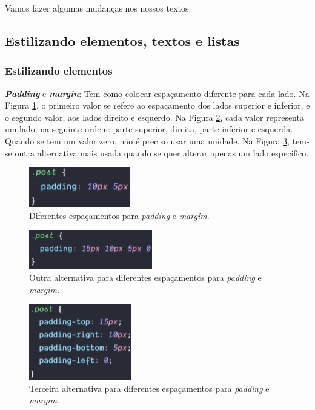 \documentclass[12pt,a4paper]{article}
\begin{document}
	Vamos fazer algumas mudanças nos nossos textos.
	
	\subsection{Estilizando elementos, textos e listas}
	\subsubsection{Estilizando elementos}
	
	\textbf{\textit{Padding}} e \textbf{\textit{margin}}: Tem como colocar espaçamento diferente para cada lado. Na Figura \ref{fig:espacamento01}, o primeiro valor se refere ao espaçamento dos lados superior e inferior, e o segundo valor, aos lados direito e esquerdo. Na Figura \ref{fig:espacamento02}, cada valor representa um lado, na seguinte ordem: parte superior, direita, parte inferior e esquerda. Quando se tem um valor zero, não é preciso usar uma unidade. Na Figura \ref{fig:espacamento03}, tem-se outra alternativa mais usada quando se quer alterar apenas um lado específico.
	
	\begin{figure}[tbph!]
		\centering
		\includegraphics[width=0.3\linewidth]{images/espacamento01}
		\caption{Diferentes espaçamentos para \textit{padding} e \textit{margim}.}
		\label{fig:espacamento01}
	\end{figure}

	\begin{figure}[tbph!]
		\centering
		\includegraphics[width=0.3\linewidth]{images/espacamento02}
		\caption{Outra alternativa para diferentes espaçamentos para \textit{padding} e \textit{margim}.}
		\label{fig:espacamento02}
	\end{figure}

	\begin{figure}[tbph!]
		\centering
		\includegraphics[width=0.3\linewidth]{images/espacamento03}
		\caption{Terceira alternativa para diferentes espaçamentos para \textit{padding} e \textit{margim}.}
		\label{fig:espacamento03}
	\end{figure}
	
\end{document}
